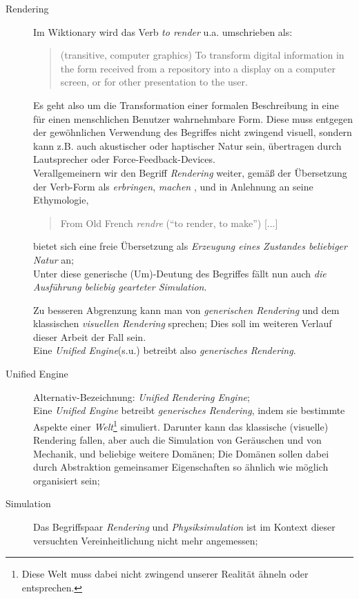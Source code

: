 \begin{description}

	\item[Rendering]
	Im Wiktionary \cite{internet:wiktionRender} wird das Verb \emph{to render} u.a. umschrieben als:
	\begin{quote}
		(transitive, computer graphics) To transform digital information in the form received from a repository into a 
		display on a computer screen, or for other presentation to the user. 
	\end{quote}	
	Es geht also um die Transformation einer formalen Beschreibung in eine für einen menschlichen Benutzer wahrnehmbare 
	Form. Diese muss entgegen der gewöhnlichen Verwendung des Begriffes nicht zwingend visuell, sondern kann z.B. auch 
	akustischer oder haptischer Natur sein, übertragen durch Lautsprecher oder Force-Feedback-Devices.\\
	
	Verallgemeinern wir den Begriff \emph{Rendering} weiter, gemäß der Übersetzung der Verb-Form als 
	\emph{erbringen}, \emph{machen} \cite{internet:dictCCrender},	
	und in Anlehnung an seine Ethymologie,
	\begin{quote}
		From Old French \emph{rendre} (“to render, to make”) [...] \cite{internet:wiktionRender}
	\end{quote}
	
	bietet sich eine freie Übersetzung als \emph{Erzeugung eines Zustandes beliebiger Natur} an;\\
	Unter diese generische (Um)-Deutung des Begriffes fällt nun auch \emph{die Ausführung beliebig gearteter Simulation}.
	
	Zu besseren Abgrenzung kann man von \emph{generischen Rendering} und dem klassischen 
	\emph{visuellen Rendering} sprechen; Dies soll im weiteren Verlauf dieser Arbeit der Fall sein.\\
	Eine \emph{Unified Engine}(s.u.) betreibt also \emph{generisches Rendering}.
	
	
	\item[Unified Engine] Alternativ-Bezeichnung: \emph{Unified Rendering Engine};\\
	Eine \emph{Unified Engine} betreibt \emph{generisches Rendering}, indem sie bestimmte Aspekte einer 
	\emph{Welt}\footnote{Diese Welt muss dabei nicht zwingend unserer Realität ähneln oder entsprechen.} simuliert. 
	Darunter kann das klassische (visuelle) Rendering fallen, aber auch die Simulation von Geräuschen und von Mechanik, und 
	beliebige weitere Domänen; Die Domänen sollen dabei durch Abstraktion gemeinsamer Eigenschaften so ähnlich wie möglich
	organisiert sein;
	
	\item[Simulation] Das Begriffspaar \emph{Rendering} und \emph{Physiksimulation} ist im Kontext dieser versuchten 
	Vereinheitlichung nicht mehr angemessen; 
	

	

	
\end{description}

